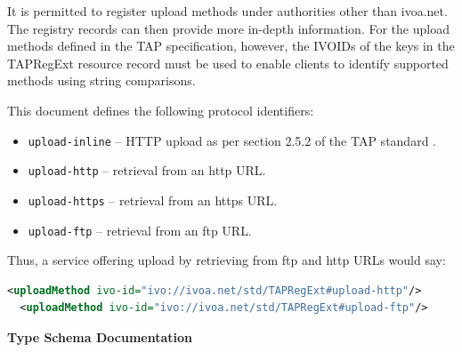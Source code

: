 \documentclass{ivoa}
\begin{document}
It is permitted to register upload methods under authorities other than
ivoa.net.
The registry records can then provide more in-depth information. For
the upload methods defined in the TAP specification, however, 
the IVOIDs of the keys in the TAPRegExt resource record must be used to enable
clients to identify supported methods using string comparisons.

This document defines the following protocol identifiers:


\begin{itemize}

\item \texttt{upload-inline} -- HTTP upload as per section 2.5.2 of 
the TAP standard \citep{std:TAP}.{}

\item \texttt{upload-http} -- retrieval from an http URL.{}

\item \texttt{upload-https} -- retrieval from an https URL.{}

\item \texttt{upload-ftp} -- retrieval from an ftp URL.{}

\end{itemize}

Thus, a service offering upload by retrieving from ftp and http URLs
would say:


\begin{lstlisting}[language=XML,basicstyle=\footnotesize]
  <uploadMethod ivo-id="ivo://ivoa.net/std/TAPRegExt#upload-http"/>
  <uploadMethod ivo-id="ivo://ivoa.net/std/TAPRegExt#upload-ftp"/>
\end{lstlisting}

\begingroup
      	\renewcommand*\descriptionlabel[1]{%
      	\hbox to 5.5em{\emph{#1}\hfil}}
      	\vspace{2ex}\noindent\textbf{ Type Schema Documentation}


\end{document}
